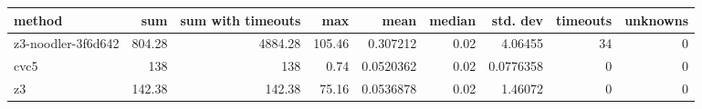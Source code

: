 \begin{tabular}{lrrrrrrrr}
\hline
 method             &    sum &   sum with timeouts &    max &      mean &   median &   std. dev &   timeouts &   unknowns \\
\hline
 z3-noodler-3f6d642 & 804.28 &             4884.28 & 105.46 & 0.307212  &     0.02 &  4.06455   &         34 &          0 \\
 cvc5               & 138    &              138    &   0.74 & 0.0520362 &     0.02 &  0.0776358 &          0 &          0 \\
 z3                 & 142.38 &              142.38 &  75.16 & 0.0536878 &     0.02 &  1.46072   &          0 &          0 \\
\hline
\end{tabular}

